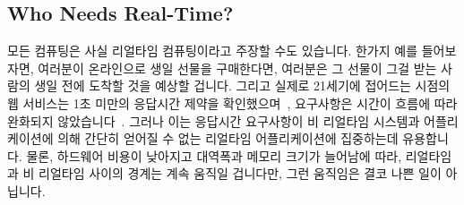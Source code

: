 \fi

\subsection{Who Needs Real-Time?}
\label{sec:advsync:Who Needs Real-Time?}

모든 컴퓨팅은 사실 리얼타임 컴퓨팅이라고 주장할 수도 있습니다.
한가지 예를 들어보자면, 여러분이 온라인으로 생일 선물을 구매한다면, 여러분은 그
선물이 그걸 받는 사람의 생일 전에 도착할 것을 예상할 겁니다.
그리고 실제로 21세기에 접어드는 시점의 웹 서비스는 1초 미만의 응답시간 제약을
확인했으며~\cite{KristofferBohmann2001a}, 요구사항은 시간이 흐름에 따라
완화되지 않았습니다~\cite{DeCandia:2007:DAH:1323293.1294281}.
그러나 이는 응답시간 요구사항이 비 리얼타임 시스템과 어플리케이션에 의해 간단히
얻어질 수 없는 리얼타임 어플리케이션에 집중하는데 유용합니다.
물론, 하드웨어 비용이 낮아지고 대역폭과 메모리 크기가 늘어남에 따라, 리얼타임과
비 리얼타임 사이의 경계는 계속 움직일 겁니다만, 그런 움직임은 결코 나쁜 일이
아닙니다.

